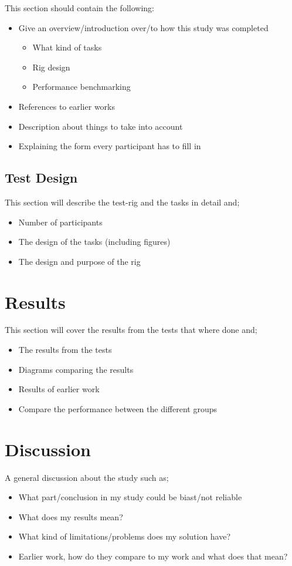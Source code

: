 \documentclass[runningheads,a4paper,oribibl]{llncs}
\begin{document}
This section should contain the following:
\begin{itemize}
	\item Give an overview/introduction over/to how this study was completed
	\begin{itemize}
		\item What kind of tasks
		\item Rig design
		\item Performance benchmarking
	\end{itemize}
	\item References to earlier works
	\item Description about things to take into account
	\item Explaining the form every participant has to fill in

\end{itemize}




\subsection{Test Design}
This section will describe the test-rig and the tasks in detail and;
\begin{itemize}
	\item Number of participants
	\item The design of the tasks (including figures)
	\item The design and purpose of the rig
\end{itemize}





\section{Results}
This section will cover the results from the tests that where done and;
\begin{itemize}
	\item The results from the tests
	\item Diagrams comparing the results
	\item Results of earlier work
	\item Compare the performance between the different groups
\end{itemize}





\section{Discussion}
A general discussion about the study such as;
\begin{itemize}
	\item What part/conclusion in my study could be biast/not reliable
	\item What does my results mean?
	\item What kind of limitations/problems does my solution have?
	\item Earlier work, how do they compare to my work and what does that mean?
\end{itemize}
\end{document}
